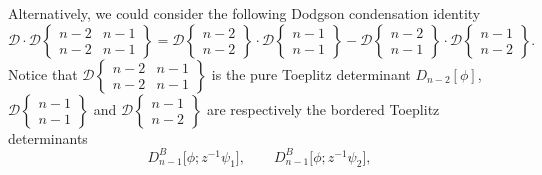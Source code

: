 \documentclass[10pt,a4paper]{amsart}
\numberwithin{equation}{section}
\begin{document}
	\begin{Remark}
		Alternatively, we could consider the following Dodgson condensation identity
		\begin{equation}\label{DODGSON2}
			\mathscr{D} \cdot \mathscr{D}\left\lbrace \begin{matrix} n-2 & n-1 \\ n-2& n-1 \end{matrix} \right\rbrace = \mathscr{D}\left\lbrace \begin{matrix} n-2 \\ n-2 \end{matrix} \right\rbrace \cdot \mathscr{D}\left\lbrace \begin{matrix} n-1 \\ n-1 \end{matrix} \right\rbrace - \mathscr{D}\left\lbrace \begin{matrix} n-2 \\ n-1 \end{matrix} \right\rbrace \cdot \mathscr{D}\left\lbrace \begin{matrix} n-1 \\ n-2 \end{matrix} \right\rbrace.
		\end{equation}
		Notice that $\mathscr{D}\left\lbrace \begin{smallmatrix} n-2 & n-1 \\ n-2& n-1 \end{smallmatrix} \right\rbrace$ is the pure Toeplitz determinant $D_{n-2}[\phi]$, $ \mathscr{D}\left\lbrace \begin{smallmatrix} n-1 \\ n-1 \end{smallmatrix} \right\rbrace$ and $ \mathscr{D}\left\lbrace \begin{smallmatrix} n-1 \\ n-2 \end{smallmatrix} \right\rbrace$ are respectively the bordered Toeplitz determinants
		\[ D^B_{n-1}\big[\phi;z^{-1}\psi_1\big],\qquad D^B_{n-1}\big[\phi;z^{-1}\psi_2\big],\]

\end{Remark}
\end{document}
